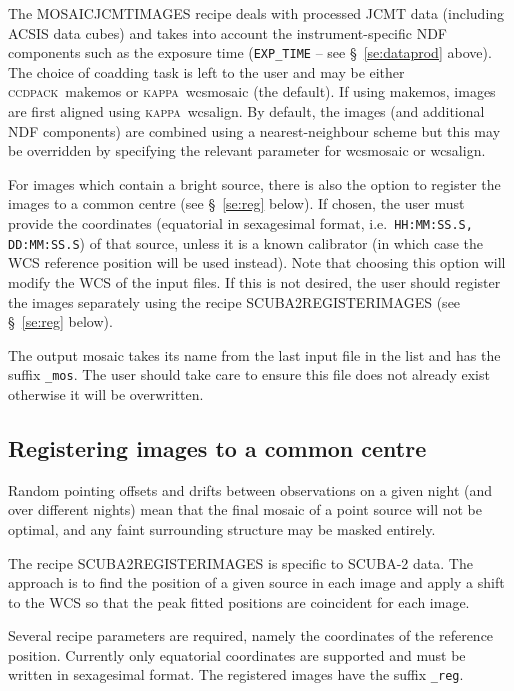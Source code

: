 \documentclass[twoside,11pt]{article}
\renewcommand{\_}{\texttt{\symbol{95}}}
\newcommand{\CCDPACK}{\textsc{ccdpack}}
\newcommand{\KAPPA}{\textsc{kappa}}
\newcommand{\task}[1]{\textsf{#1}}
\begin{document}
The \task{MOSAIC\_JCMT\_IMAGES} recipe deals with processed JCMT data
(including ACSIS data cubes) and takes into account the
instrument-specific NDF components such as the exposure time
(\verb+EXP_TIME+ -- see \S\ \ref{se:dataprod} above). The choice of
coadding task is left to the user and may be either
\CCDPACK\ \task{makemos} or \KAPPA\ \task{wcsmosaic} (the default). If
using \task{makemos}, images are first aligned using
\KAPPA\ \task{wcsalign}. By default, the images (and additional NDF
components) are combined using a nearest-neighbour scheme but this may
be overridden by specifying the relevant parameter for
\task{wcsmosaic} or \task{wcsalign}.

For images which contain a bright source, there is also the option to
register the images to a common centre (see \S\ \ref{se:reg}
below). If chosen, the user must provide the coordinates (equatorial
in sexagesimal format, i.e.\ \verb+HH:MM:SS.S, DD:MM:SS.S+) of that
source, unless it is a known calibrator (in which case the WCS
reference position will be used instead). Note that choosing this
option will modify the WCS of the input files. If this is not desired,
the user should register the images separately using the recipe
\task{SCUBA2\_REGISTER\_IMAGES} (see \S\ \ref{se:reg} below).

The output mosaic takes its name from the last input file in the list
and has the suffix \verb+_mos+. The user should take care to ensure
this file does not already exist otherwise it will be overwritten.

\subsection{Registering images to a common centre\label{se:reg}}

Random pointing offsets and drifts between observations on a given
night (and over different nights) mean that the final mosaic of a
point source will not be optimal, and any faint surrounding structure
may be masked entirely.

The recipe \task{SCUBA2\_REGISTER\_IMAGES} is specific to SCUBA-2
data.  The approach is to find the position of a given source in each
image and apply a shift to the WCS so that the peak fitted positions
are coincident for each image.

Several recipe parameters are required, namely the coordinates of the
reference position. Currently only equatorial coordinates are
supported and must be written in sexagesimal format. The registered
images have the suffix \verb+_reg+.
\end{document}

